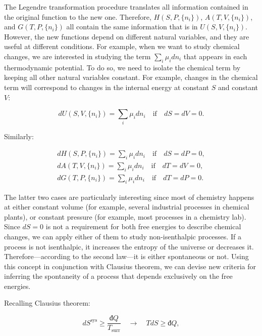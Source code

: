 \documentclass[
]{book}
\theoremstyle{definition}
\theoremstyle{definition}
\theoremstyle{definition}
\theoremstyle{remark}
\begin{document}
The Legendre transformation procedure translates all information contained in the original function to the new one. Therefore, \(H(S,P,\{n_i\})\), \(A(T,V,\{n_i\})\), and \(G(T,P,\{n_i\})\) all contain the same information that is in \(U(S,V,\{n_i\})\). However, the new functions depend on different natural variables, and they are useful at different conditions. For example, when we want to study chemical changes, we are interested in studying the term \(\sum_i\mu_i dn_i\) that appears in each thermodynamic potential. To do so, we need to isolate the chemical term by keeping all other natural variables constant. For example, changes in the chemical term will correspond to changes in the internal energy at constant \(S\) and constant \(V\):

\begin{equation}
dU(S,V,\{n_i\}) = \sum_i\mu_i dn_i \quad \text{if} \quad dS=dV=0.
\label{eq:duchem}
\end{equation}

Similarly:

\begin{equation}
\begin{aligned}
dH(S,P,\{n_i\}) = \sum_i\mu_i dn_i \quad \text{if} \quad dS=dP=0, \\
dA(T,V,\{n_i\}) = \sum_i\mu_i dn_i \quad \text{if} \quad dT=dV=0, \\
dG(T,P,\{n_i\}) = \sum_i\mu_i dn_i \quad \text{if} \quad dT=dP=0.
\end{aligned}
\label{eq:dhagchem}
\end{equation}

The latter two cases are particularly interesting since most of chemistry happens at either constant volume (for example, several industrial processes in chemical plants), or constant pressure (for example, most processes in a chemistry lab). Since \(dS=0\) is not a requirement for both free energies to describe chemical changes, we can apply either of them to study non-isenthalpic processes. If a process is not isenthalpic, it increases the entropy of the universe or decreases it. Therefore---according to the second law---it is either spontaneous or not. Using this concept in conjunction with Clausius theorem, we can devise new criteria for inferring the spontaneity of a process that depends exclusively on the free energies.

Recalling Clausius theorem:

\begin{equation}
d S^{\mathrm{sys}} \geq \frac{đQ}{T_{\text{surr}}} \quad \longrightarrow \quad TdS \geq đQ,
\label{eq:dssyscrit}
\end{equation}
\end{document}
